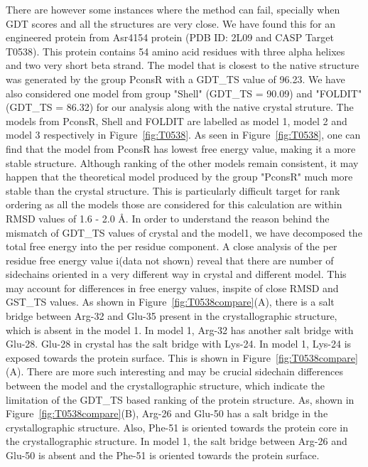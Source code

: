 \documentclass[12pt]{article}
\begin{document}
There are however some instances where the method can fail, specially when GDT scores and all the structures are
very close. We have found this for an engineered protein from Asr4154 protein (PDB ID: 2L09 and CASP Target T0538).
This protein contains 54 amino acid residues with three alpha helixes and two very short beta strand. 
The model that is closest to the native structure was generated by the group PconsR with a GDT\_TS value of 96.23.
We have also considered one model from group "Shell" (GDT\_TS = 90.09) and "FOLDIT" (GDT\_TS = 86.32) for our analysis along with
the native crystal struture. The models from PconsR, Shell and FOLDIT are labelled as model 1, model 2 and model 3 
respectively in Figure~\ref{fig:T0538}. As seen in Figure~\ref{fig:T0538}, one can find that the 
model from PconsR has lowest free energy value, making it a more stable structure. Although ranking of the other models
remain consistent, it may happen that the theoretical model produced by the group "PconsR" much more stable than the 
crystal structure. This is particularly difficult target for rank ordering as all the models those are considered for this 
calculation are within RMSD values of 1.6 - 2.0 \AA. In order to understand the reason behind the mismatch of GDT\_TS values
of crystal and the model1, we have decomposed the total free energy into the per residue component. A close analysis of 
the per residue free energy value i(data not shown) reveal that there are number of sidechains oriented in a very different way in crystal and different 
model. This may account for differences in free energy values, inspite of close RMSD and GST\_TS values. As shown in Figure~\ref{fig:T0538compare}(A),
there is a salt bridge between Arg-32 and Glu-35 present in the crystallographic structure, which is absent in the
model 1. In model 1, Arg-32 has another salt bridge with Glu-28. Glu-28 in crystal has the salt bridge with Lys-24. In model 1, Lys-24 is
exposed towards the protein surface. This is shown in Figure~\ref{fig:T0538compare}(A). There are more such interesting and may be crucial
sidechain differences between the model and the crystallographic structure, which indicate the limitation of the GDT\_TS based 
ranking of the protein structure. As, shown in Figure~\ref{fig:T0538compare}(B), Arg-26 and Glu-50 has a salt bridge in the crystallographic 
structure. Also, Phe-51 is oriented towards the protein core in the crystallographic structure. In model 1, the salt bridge between Arg-26 and Glu-50
is absent and the Phe-51 is oriented towards the protein surface.   
\end{document}

